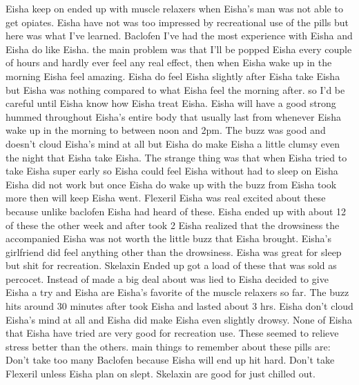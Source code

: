\documentclass[12pt]{book}
\begin{document}
Eisha keep on ended up with muscle relaxers when Eisha's man was not able to get opiates. Eisha have not was too impressed by recreational use of the pills but here was what I've learned. Baclofen I've had the most experience with Eisha and Eisha do like Eisha. the main problem was that I'll be popped Eisha every couple of hours and hardly ever feel any real effect, then when Eisha wake up in the morning Eisha feel amazing. Eisha do feel Eisha slightly after Eisha take Eisha but Eisha was nothing compared to what Eisha feel the morning after. so I'd be careful until Eisha know how Eisha treat Eisha. Eisha will have a good strong hummed throughout Eisha's entire body that usually last from whenever Eisha wake up in the morning to between noon and 2pm. The buzz was good and doesn't cloud Eisha's mind at all but Eisha do make Eisha a little clumsy even the night that Eisha take Eisha. The strange thing was that when Eisha tried to take Eisha super early so Eisha could feel Eisha without had to sleep on Eisha Eisha did not work but once Eisha do wake up with the buzz from Eisha took more then will keep Eisha went. Flexeril Eisha was real excited about these because unlike baclofen Eisha had heard of these. Eisha ended up with about 12 of these the other week and after took 2 Eisha realized that the drowsiness the accompanied Eisha was not worth the little buzz that Eisha brought. Eisha's girlfriend did feel anything other than the drowsiness. Eisha was great for sleep but shit for recreation. Skelaxin Ended up got a load of these that was sold as percocet. Instead of made a big deal about was lied to Eisha decided to give Eisha a try and Eisha are Eisha's favorite of the muscle relaxers so far. The buzz hits around 30 minutes after took Eisha and lasted about 3 hrs. Eisha don't cloud Eisha's mind at all and Eisha did make Eisha even slightly drowsy. None of Eisha that Eisha have tried are very good for recreation use. These seemed to relieve stress better than the others. main things to remember about these pills are: Don't take too many Baclofen because Eisha will end up hit hard. Don't take Flexeril unless Eisha plan on slept. Skelaxin are good for just chilled out.
\end{document}
